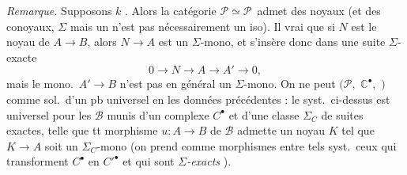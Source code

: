\documentclass[11pt,a4paper]{article}
\begin{document}
\emph{Remarque.} Supposons $k$ . Alors la catégorie
$\mathcal{P} \simeq \mathcal{P}$\,\ill{} \struck{\ill{}} admet des
\struck{$\Sigma$} noyaux (et des conoyaux, $\Sigma$ mais un
 n'est pas nécessairement un iso). Il
 vrai que si $N$ est le noyau de $A \to B$, alors
$N \to A$ est un $\Sigma$-mono, et s'insère donc dans une suite
$\Sigma$-exacte
\[
0 \to N \to A \to A' \to 0 ,
\]
mais le mono.\ $A' \to B$ n'est pas en général un $\Sigma$-mono.
 On ne peut 
$(\mathcal{P},$ \struck{\ill{}} $\mathbb{C}^{\bullet},$ \struck{\ill{}}$)$ comme
sol.\ d'un pb universel en \ill{} \ill{} les données précédentes :
 le syst.\ ci-dessus est
universel pour les $\mathcal{B}$  munis d'un complexe
 $C^{\bullet}$
et d'une classe $\Sigma_C$ de suites exactes, telle que tt morphisme
$u : A \to B$ de $\mathcal{B}$ admette un noyau $K$ tel que $K \to A$ soit
un $\Sigma_C$-mono (on prend comme morphismes entre tels syst.\ ceux qui
transforment $C^{\bullet}$ en $C'^{\bullet}$ et qui sont
\emph{$\Sigma$-exacts} \ill{}).
\end{document}
